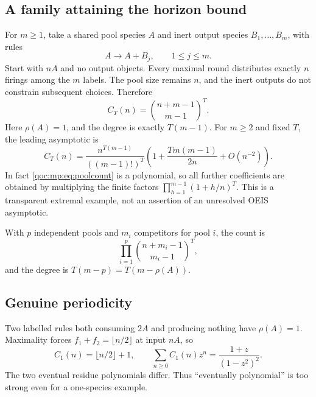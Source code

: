 \documentclass[11pt,letterpaper]{article}
\theoremstyle{definition}
\theoremstyle{remark}
\begin{document}
\subsection{A family attaining the horizon bound}
For $m\ge1$, take a shared pool species $A$ and inert output species
$B_1,\ldots,B_m$, with rules
\begin{equation}\label{qoc:mp:eq:pool}
 A\longrightarrow A+B_j,\qquad 1\le j\le m.
\end{equation}
Start with $nA$ and no output objects. Every maximal round distributes
exactly $n$ firings among the $m$ labels. The pool size remains $n$, and
the inert outputs do not constrain subsequent choices. Therefore
\begin{equation}\label{qoc:mp:eq:poolcount}
 C_T(n)=\binom{n+m-1}{m-1}^{\!T}.
\end{equation}
Here $\rho(A)=1$, and the degree is exactly $T(m-1)$. For $m\ge2$ and
fixed $T$, the leading asymptotic is
\begin{equation}\label{qoc:mp:eq:poolasymptotic}
 C_T(n)=\frac{n^{T(m-1)}}{((m-1)!)^T}
 \left(1+\frac{Tm(m-1)}{2n}+O(n^{-2})\right).
\end{equation}
In fact \eqref{qoc:mp:eq:poolcount} is a polynomial, so all further coefficients
are obtained by multiplying the finite factors
$\prod_{h=1}^{m-1}(1+h/n)^T$. This is a transparent extremal example, not
an assertion of an unresolved OEIS asymptotic.

With $p$ independent pools and $m_i$ competitors for pool $i$, the count is
\[
 \prod_{i=1}^p\binom{n+m_i-1}{m_i-1}^{\!T},
\]
and the degree is $T(m-p)=T(m-\rho(A))$.

\subsection{Genuine periodicity}
Two labelled rules both consuming $2A$ and producing nothing have
$\rho(A)=1$. Maximality forces
$f_1+f_2=\lfloor n/2\rfloor$ at input $nA$, so
\begin{equation}\label{qoc:mp:eq:periodiccount}
 C_1(n)=\lfloor n/2\rfloor+1,
 \qquad
 \sum_{n\ge0}C_1(n)z^n=\frac{1+z}{(1-z^2)^2}.
\end{equation}
The two eventual residue polynomials differ. Thus ``eventually polynomial''
is too strong even for a one-species example.
\end{document}
